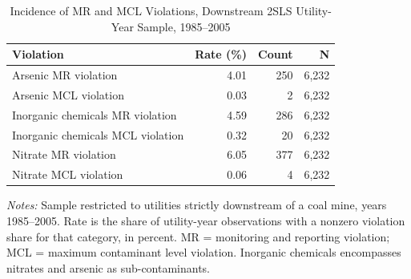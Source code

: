 
\begin{table}[htbp]
\centering
\caption{Incidence of MR and MCL Violations, Downstream 2SLS Utility-Year Sample, 1985--2005}
\label{tab:mr_mcl_incidence_summary}
\small
\begin{tabular}{lrrr}
\hline\hline
\textbf{Violation} & \textbf{Rate (\%)} & \textbf{Count} & \textbf{N} \\
\hline
Arsenic MR violation & 4.01 & 250 & 6,232 \\
Arsenic MCL violation & 0.03 & 2 & 6,232 \\
Inorganic chemicals MR violation & 4.59 & 286 & 6,232 \\
Inorganic chemicals MCL violation & 0.32 & 20 & 6,232 \\
Nitrate MR violation & 6.05 & 377 & 6,232 \\
Nitrate MCL violation & 0.06 & 4 & 6,232 \\
\hline\hline
\end{tabular}
\begin{minipage}{\linewidth}
\vspace{4pt}
\footnotesize
\raggedright
\textit{Notes:} Sample restricted to utilities strictly downstream of a coal mine, years 1985--2005. Rate is the share of utility-year observations with a nonzero violation share for that category, in percent. MR = monitoring and reporting violation; MCL = maximum contaminant level violation. Inorganic chemicals encompasses nitrates and arsenic as sub-contaminants.
\end{minipage}
\end{table}

